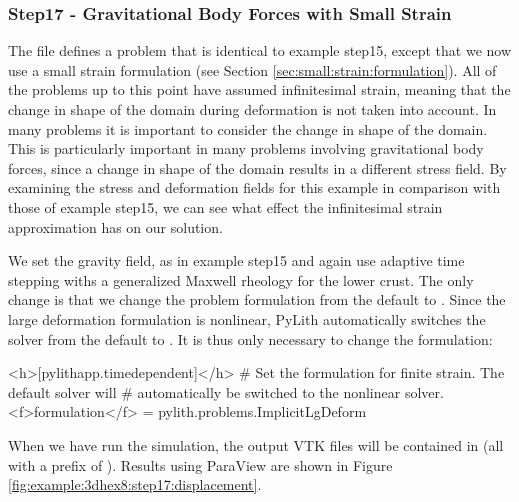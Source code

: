 \subsubsection{Step17 - Gravitational Body Forces with Small Strain}

The  file defines a problem that is identical to
example step15, except that we now use a small strain formulation
(see Section \vref{sec:small:strain:formulation}). All of the problems
up to this point have assumed infinitesimal strain, meaning that the
change in shape of the domain during deformation is not taken into
account. In many problems it is important to consider the change in
shape of the domain. This is particularly important in many problems
involving gravitational body forces, since a change in shape of the
domain results in a different stress field. By examining the stress
and deformation fields for this example in comparison with those of
example step15, we can see what effect the infinitesimal strain approximation
has on our solution.

We set the gravity field, as in example step15 and again use adaptive
time stepping withs a generalized Maxwell rheology for the lower crust.
The only change is that we change the problem formulation from the
default  to . Since the
large deformation formulation is nonlinear, PyLith automatically switches
the solver from the default  to .
It is thus only necessary to change the formulation:
\begin{cfg}
<h>[pylithapp.timedependent]</h>
# Set the formulation for finite strain. The default solver will
# automatically be switched to the nonlinear solver.
<f>formulation</f> = pylith.problems.ImplicitLgDeform
\end{cfg}
When we have run the simulation, the output VTK files will be contained
in  (all with a prefix of ).
Results using ParaView are shown in Figure \vref{fig:example:3dhex8:step17:displacement}.


